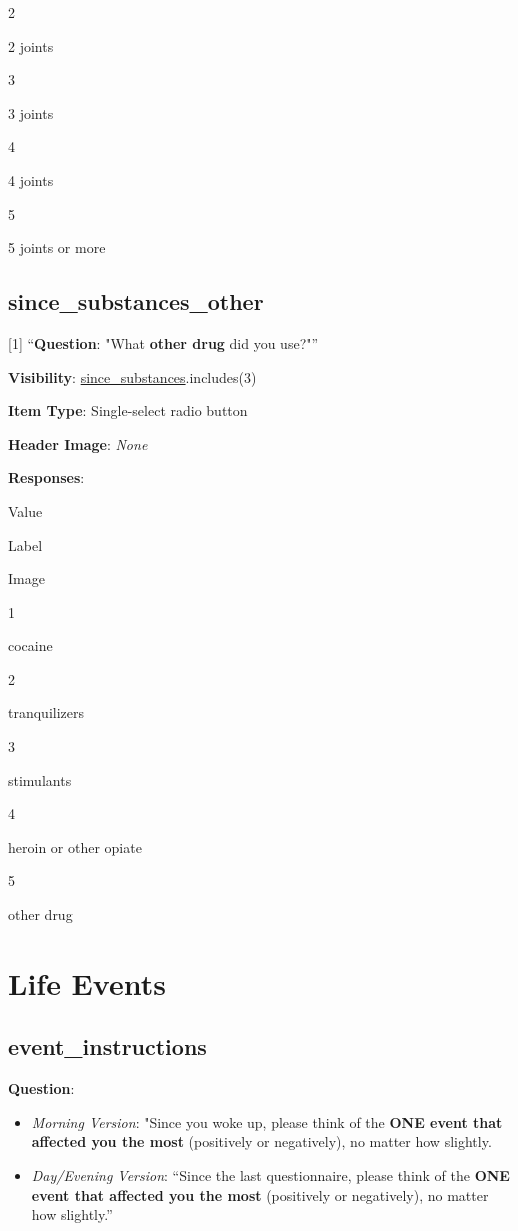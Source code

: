 \documentclass[]{book}
\providecommand{\tightlist}{%
  \setlength{\itemsep}{0pt}\setlength{\parskip}{0pt}}
\begin{document}
2

2 joints

3

3 joints

4

4 joints

5

5 joints or more

\hypertarget{since_substances_other}{%
\section{since\_substances\_other}\label{since_substances_other}}

{[}1{]} ``\textbf{Question}: "What \textbf{other drug} did you use?"''

\textbf{Visibility}: \protect\hyperlink{since_substances}{since\_substances}.includes(3)

\textbf{Item Type}: Single-select radio button

\textbf{Header Image}: \emph{None}

\textbf{Responses}:

Value

Label

Image

1

cocaine

2

tranquilizers

3

stimulants

4

heroin or other opiate

5

other drug

\hypertarget{events_section}{%
\chapter{Life Events}\label{events_section}}

\hypertarget{event_instructions}{%
\section{event\_instructions}\label{event_instructions}}

\textbf{Question}:

\begin{itemize}
\tightlist
\item
  \emph{Morning Version}: "Since you woke up, please think of the \textbf{ONE event that affected you the most} (positively or negatively), no matter how slightly.
\item
  \emph{Day/Evening Version}: ``Since the last questionnaire, please think of the \textbf{ONE event that affected you the most} (positively or negatively), no matter how slightly.''
\end{itemize}
\end{document}
